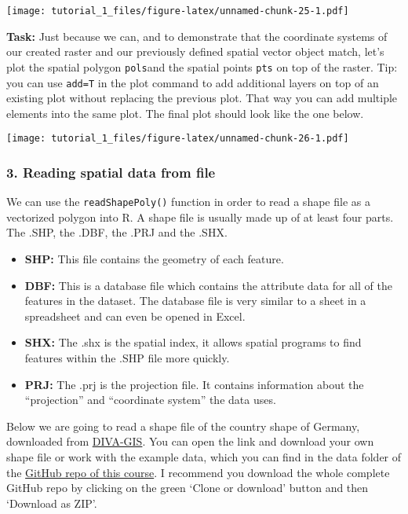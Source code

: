 \documentclass[]{article}
\providecommand{\tightlist}{%
  \setlength{\itemsep}{0pt}\setlength{\parskip}{0pt}}
\begin{document}
\texttt{[image: tutorial\_1\_files/figure-latex/unnamed-chunk-25-1.pdf]}

\textbf{Task:} Just because we can, and to demonstrate that the
coordinate systems of our created raster and our previously defined
spatial vector object match, let's plot the spatial polygon
\texttt{pols}and the spatial points \texttt{pts} on top of the raster.
Tip: you can use \texttt{add=T} in the plot command to add additional
layers on top of an existing plot without replacing the previous plot.
That way you can add multiple elements into the same plot. The final
plot should look like the one below.

\texttt{[image: tutorial\_1\_files/figure-latex/unnamed-chunk-26-1.pdf]}

\hypertarget{reading-spatial-data-from-file}{%
\subsubsection{3. Reading spatial data from
file}\label{reading-spatial-data-from-file}}

We can use the \texttt{readShapePoly()} function in order to read a
shape file as a vectorized polygon into R. A shape file is usually made
up of at least four parts. The .SHP, the .DBF, the .PRJ and the .SHX.

\begin{itemize}
\tightlist
\item
  \textbf{SHP:} This file contains the geometry of each feature.
\item
  \textbf{DBF:} This is a database file which contains the attribute
  data for all of the features in the dataset. The database file is very
  similar to a sheet in a spreadsheet and can even be opened in Excel.
\item
  \textbf{SHX:} The .shx is the spatial index, it allows spatial
  programs to find features within the .SHP file more quickly.
\item
  \textbf{PRJ:} The .prj is the projection file. It contains information
  about the ``projection'' and ``coordinate system'' the data uses.
\end{itemize}

Below we are going to read a shape file of the country shape of Germany,
downloaded from \href{http://www.diva-gis.org/gdata}{DIVA-GIS}. You can
open the link and download your own shape file or work with the example
data, which you can find in the data folder of the
\href{https://github.com/tobiashofmann88/spatial_R_course}{GitHub repo
of this course}. I recommend you download the whole complete GitHub repo
by clicking on the green `Clone or download' button and then `Download
as ZIP'.
\end{document}
